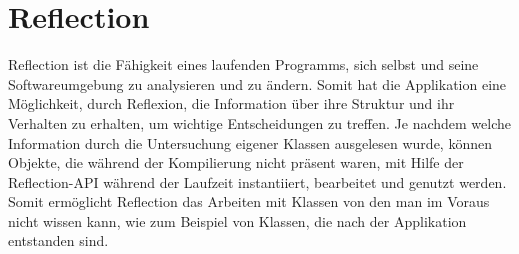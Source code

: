 \section{Reflection}\label{sec:reflaction}
  Reflection ist die Fähigkeit eines laufenden Programms, sich selbst und seine Softwareumgebung zu analysieren und zu ändern. 
  Somit hat die Applikation eine Möglichkeit, durch Reflexion, die Information über ihre Struktur und ihr Verhalten zu erhalten, um wichtige Entscheidungen zu treffen. \newline
  Je nachdem welche Information durch die Untersuchung eigener Klassen ausgelesen wurde, können Objekte, die während der Kompilierung nicht präsent waren, mit Hilfe der Reflection-API während der Laufzeit instantiiert, bearbeitet und genutzt werden. Somit ermöglicht Reflection das Arbeiten mit Klassen von den man im Voraus nicht wissen kann, wie zum Beispiel von Klassen, die nach der Applikation entstanden sind.

